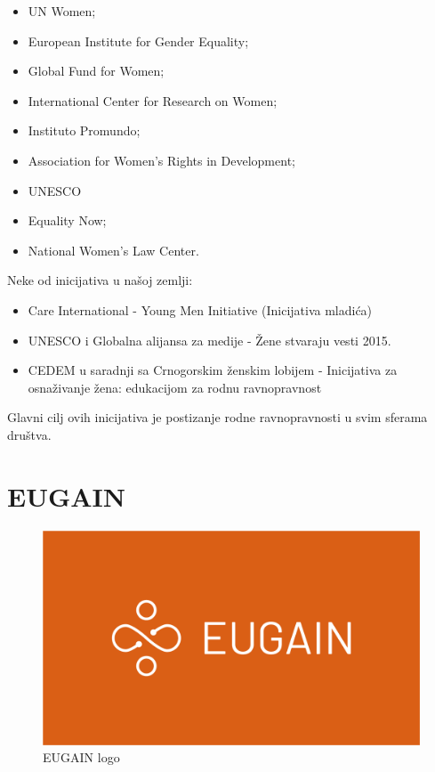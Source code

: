 \documentclass[a4paper]{article}
\begin{document}
\begin{itemize}
\item UN Women;
\item European Institute for Gender Equality;
\item Global Fund for Women;
\item International Center for Research on Women;
\item Instituto Promundo;
\item Association for Women's Rights in Development;
\item UNESCO
\item Equality Now;
\item National Women's Law Center.
\end{itemize}
Neke od inicijativa u našoj zemlji:

\begin{itemize}
\item Care International - Young Men Initiative (Inicijativa mladića)
\item UNESCO i Globalna alijansa za medije - Žene stvaraju vesti 2015.
\item CEDEM u saradnji sa Crnogorskim ženskim lobijem - Inicijativa za osnaživanje žena: edukacijom za rodnu ravnopravnost
\end{itemize}
Glavni cilj ovih inicijativa je postizanje rodne ravnopravnosti u svim sferama društva.

\section{EUGAIN}

\begin{figure}[h]
\centerline{\includegraphics[scale=0.15]{images/eugain.png}}
\caption{EUGAIN logo}
\end{figure}
\end{document}
